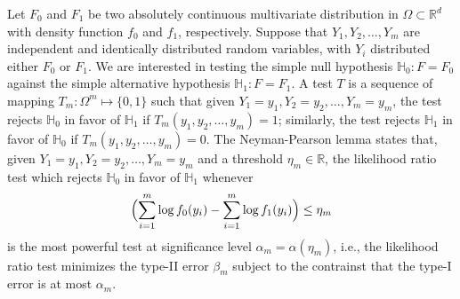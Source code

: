 \documentclass[10pt]{article}
\begin{document}
Let $F_0$ and $F_1$ be two absolutely continuous multivariate distribution in $\Omega \subset \mathbb{R}^{d}$ with density function $f_0$ and $f_1$, respectively. Suppose that $Y_1, Y_2, \dots, Y_m$ are independent and identically distributed random variables, with $Y_i$ distributed either $F_0$ or $F_1$. We are interested in testing the simple null hypothesis $\mathbb{H}_0 \colon F = F_0$ against the simple alternative hypothesis $\mathbb{H}_1 \colon F = F_1$. A test $T$ is a sequence of mapping $T_m \colon \Omega^{m} \mapsto \{0,1\}$ such that given $Y_1 = y_1, Y_2 = y_2, \dots, Y_m = y_m$, the test rejects $\mathbb{H}_0$ in favor of $\mathbb{H}_1$ if $T_m(y_1, y_2, \dots, y_m) = 1$; similarly, the test rejects $\mathbb{H}_1$ in favor of $\mathbb{H}_0$ if $T_m(y_1, y_2, \dots, y_m) = 0$.
The Neyman-Pearson lemma states that, given $Y_1 = y_1, Y_2 = y_2, \dots, Y_m = y_m$ and a threshold $\eta_m \in \mathbb{R}$, the likelihood ratio test which rejects $\mathbb{H}_0$ in favor of $\mathbb{H}_1$ whenever
$$ \Bigl(\sum_{i=1}^{m} \log{f_0(y_i)} - \sum_{i=1}^{m} \log{f_1(y_i)} \Bigr) \leq \eta_m $$
is the most powerful test at significance level $\alpha_m = \alpha(\eta_m)$, i.e., the likelihood ratio test minimizes the type-II error $\beta_m$ subject to the contrainst that the type-I error is at most $\alpha_m$.
\end{document}

